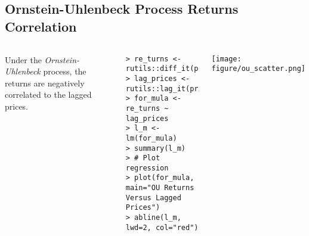 \documentclass[10pt]{beamer}\usepackage[]{graphicx}\usepackage[]{color}
\makeatletter
\newenvironment{kframe}{%
 \def\at@end@of@kframe{}%
 \ifinner\ifhmode%
  \def\at@end@of@kframe{\end{minipage}}%
  \begin{minipage}{\columnwidth}%
 \fi\fi%
 \def\FrameCommand##1{\hskip\@totalleftmargin \hskip-\fboxsep
 \colorbox{shadecolor}{##1}\hskip-\fboxsep
     \hskip-\linewidth \hskip-\@totalleftmargin \hskip\columnwidth}%
 \MakeFramed {\advance\hsize-\width
   \@totalleftmargin\z@ \linewidth\hsize
   \@setminipage}}%
 {\par\unskip\endMakeFramed%
 \at@end@of@kframe}
\newenvironment{knitrout}{}{} %
\makeatother
\begin{document}
\subsection{Ornstein-Uhlenbeck Process Returns Correlation}
\begin{frame}[fragile,t]{\subsecname}
\vspace{-1em}
\begin{block}{}
  \begin{columns}[T]
      Under the \emph{Ornstein-Uhlenbeck} process, the returns are negatively correlated to the lagged prices.
\begin{knitrout}\tiny
{}\color{fgcolor}\begin{kframe}
\begin{verbatim}
> re_turns <- rutils::diff_it(price_s)
> lag_prices <- rutils::lag_it(price_s)
> for_mula <- re_turns ~ lag_prices
> l_m <- lm(for_mula)
> summary(l_m)
> # Plot regression
> plot(for_mula, main="OU Returns Versus Lagged Prices")
> abline(l_m, lwd=2, col="red")
\end{verbatim}
\end{kframe}
\end{knitrout}
      \texttt{[image: figure/ou\_scatter.png]}
  \end{columns}
\end{block}

\end{frame}


\end{document}
